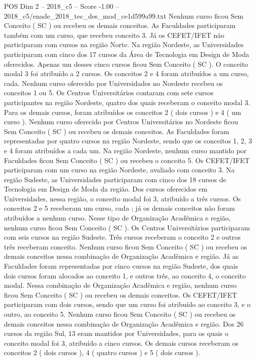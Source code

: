 \begin{textsample}{POS Dim 2 – 2018\_c5 – Score -1.00 – 2018\_c5/enade\_2018\_tec\_des\_mod\_ce1d599a99.txt}
Nenhum curso ficou Sem Conceito ( SC ) ou recebeu os demais conceitos.
As Faculdades participaram também com um curso, que recebeu conceito 3.
Já os CEFET/IFET não participaram com cursos na região Norte.
Na região Nordeste, as Universidades participaram com cinco dos 17 cursos da Área de Tecnologia em Design de Moda oferecidos.
Apenas um desses cinco cursos ficou Sem Conceito ( SC ).
O conceito modal 3 foi atribuído a 2 cursos.
Os conceitos 2 e 4 foram atribuídos a um curso, cada.
Nenhum curso oferecido por Universidades no Nordeste recebeu os conceitos 1 ou 5.
Os Centros Universitários contaram com sete cursos participantes na região Nordeste, quatro dos quais receberam o conceito modal 3.
Para os demais cursos, foram atribuídos os conceitos 2 ( dois cursos ) e 4 ( um curso ).
Nenhum curso oferecido por Centros Universitários no Nordeste ficou Sem Conceito ( SC ) ou recebeu os demais conceitos.
As Faculdades foram representadas por quatro cursos na região Nordeste, sendo que os conceitos 1, 2, 3 e 4 foram atribuídos a cada um.
Na região Nordeste, nenhum curso mantido por Faculdades ficou Sem Conceito ( SC ) ou recebeu o conceito 5.
Os CEFET/IFET participaram com um curso na região Nordeste, avaliado com conceito 3.
Na região Sudeste, as Universidades participaram com cinco dos 18 cursos de Tecnologia em Design de Moda da região.
Dos cursos oferecidos em Universidades, nessa região, o conceito modal foi 3, atribuído a três cursos.
Os conceitos 2 e 5 receberam um curso, cada ; já os demais conceitos não foram atribuídos a nenhum curso.
Nesse tipo de Organização Acadêmica e região, nenhum curso ficou Sem Conceito ( SC ).
Os Centros Universitários participaram com seis cursos na região Sudeste.
Três cursos receberam o conceito 2 e outros três receberam conceito.
Nenhum curso ficou Sem Conceito ( SC ) ou recebeu os demais conceitos nessa combinação de Organização Acadêmica e região.
Já as Faculdades foram representadas por cinco cursos na região Sudeste, dos quais dois cursos foram alocados ao conceito 1, e outros três, ao conceito 4, o conceito modal.
Nessa combinação de Organização Acadêmica e região, nenhum curso ficou Sem Conceito ( SC ) ou recebeu os demais conceitos.
Os CEFET/IFET participaram com dois cursos, sendo que um curso foi atribuído ao conceito 3, e o outro, ao conceito 5.
Nenhum curso ficou Sem Conceito ( SC ) ou recebeu os demais conceitos nessa combinação de Organização Acadêmica e região.
Dos 26 cursos da região Sul, 13 eram mantidos por Universidades, para os quais o conceito modal foi 3, atribuído a cinco cursos.
Os demais cursos receberam os conceitos 2 ( dois cursos ), 4 ( quatro cursos ) e 5 ( dois cursos ).

\end{textsample}
